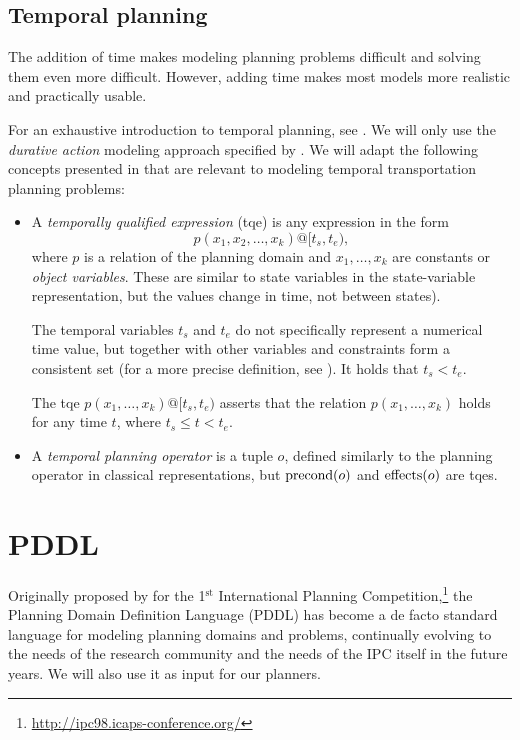 \subsection{Temporal planning}

The addition of time makes modeling planning problems difficult and
solving them even more difficult.
However, adding time makes most models more realistic and practically usable.

For an exhaustive introduction to temporal planning, see \citet[Chapter~13~and~14]{Ghallab2004}. We will only use the \textit{durative action} modeling approach
specified by \citet[Section~5]{Fox2003}. We will adapt the following concepts presented
in \citet[Section~14.2]{Ghallab2004} that are relevant to modeling temporal transportation planning problems:
\begin{itemize}
\item A \textit{temporally qualified expression} (tqe) is any
expression in the form $$p(x_1, x_2, \ldots, x_k)@[t_s, t_e),$$ where $p$
is a relation of the planning domain and $x_1, \ldots, x_k$ are constants or \textit{object
variables}. These are similar to state variables in the state-variable representation,
but the values change in time, not between states).

The temporal variables $t_s$ and $t_e$ do not specifically represent a numerical time value, but together with other variables and constraints form a consistent set (for a more precise definition, see \citet[Section~14.2.1]{Ghallab2004}).
It holds that $t_s < t_e$.

The tqe $p(x_1, \ldots, x_k)@[t_s, t_e)$
asserts that the relation $p(x_1, \ldots, x_k)$ holds for any time $t$, where
$t_s \leq t < t_e$.

\item A \textit{temporal planning operator} is a tuple $o$, defined similarly to the planning operator in classical representations, but $\operatorname{\textrm{precond}}(o)$ and $\operatorname{\textrm{effects}}(o)$ are tqes.
\end{itemize}













\section{PDDL}\label{pddl}

Originally proposed by \citet{McDermott1998} for the 1$^{\mathrm{st}}$ International Planning
Competition,\footnote{\url{http://ipc98.icaps-conference.org/}}
the Planning Domain Definition Language (PDDL) has become
a de facto standard language for modeling planning domains and problems,
continually evolving to the needs of the  
research community and the needs of the IPC itself in the future years.
We will also use it as input for our planners.

